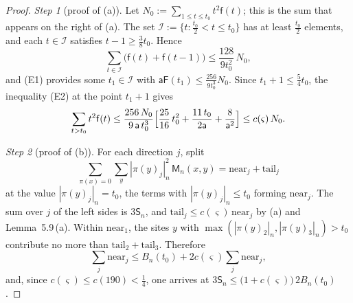 \documentclass[11pt,letterpaper,reqno]{amsart}
\theoremstyle{definition}
\begin{document}
\begin{proof}
\emph{Step 1} (proof of (a)).
Let $N_0:=\sum_{1\le t\le t_0}t^2\mathsf f(t)$; this is the sum that appears on the right of (a).
The set $\mathcal I:=\{t:\frac{t_0}2<t\le t_0\}$ has at least $\frac{t_0}2$ elements, and each $t\in\mathcal I$ satisfies $t-1\ge\frac38t_0$.
Hence
\begin{equation*}
\sum_{t\in\mathcal I}\bigl(\mathsf f(t)+\mathsf f(t-1)\bigr)\le\frac{128}{9t_0^2}\,N_0,
\end{equation*}
and (E1) provides some $t_1\in\mathcal I$ with $\mathsf a\mathsf F(t_1)\le\frac{256}{9t_0^3}N_0$.
Since $t_1+1\le\frac54t_0$, the inequality (E2) at the point $t_1+1$ gives
\begin{equation*}
\sum_{t>t_0}t^2\mathsf f(t)\le\frac{256\,N_0}{9\,\mathsf a\,t_0^3}\Bigl[\frac{25}{16}\,t_0^2+\frac{11\,t_0}{2\mathsf a}+\frac{8}{\mathsf a^2}\Bigr]\le c(\varsigma)\,N_0.
\end{equation*}

\emph{Step 2} (proof of (b)).
For each direction $j$, split
\begin{equation*}
\sum_{\pi(x)=0}\sum_y|\pi(y)_j|_n^2\,\mathsf M_n(x,y)=\mathrm{near}_j+\mathrm{tail}_j
\end{equation*}
at the value $|\pi(y)_j|_n=t_0$, the terms with $|\pi(y)_j|_n\le t_0$ forming $\mathrm{near}_j$.
The sum over $j$ of the left sides is $3\mathsf S_n$, and $\mathrm{tail}_j\le c(\varsigma)\,\mathrm{near}_j$ by (a) and Lemma~5.9\,(a).
Within $\mathrm{near}_1$, the sites $y$ with $\max(|\pi(y)_2|_n,|\pi(y)_3|_n)>t_0$ contribute no more than $\mathrm{tail}_2+\mathrm{tail}_3$.
Therefore
\begin{equation*}
\sum_j\mathrm{near}_j\le B_n(t_0)+2c(\varsigma)\sum_j\mathrm{near}_j,
\end{equation*}
and, since $c(\varsigma)\le c(190)<\frac14$, one arrives at $3\mathsf S_n\le\bigl(1+c(\varsigma)\bigr)\,2B_n(t_0)$.


\end{proof}
\end{document}
